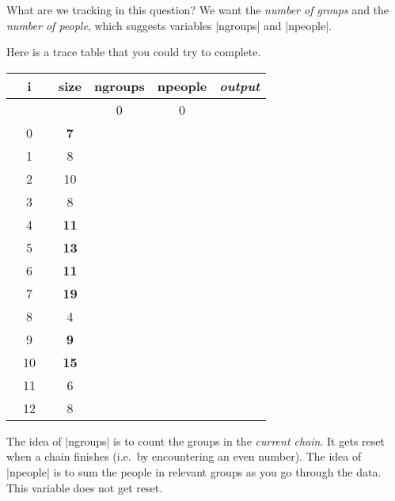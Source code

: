 What are we tracking in this question? We want the \emph{number of groups} and the
\emph{number of people}, which suggests variables \pycode|ngroups| and \pycode|npeople|.

Here is a trace table that you could try to complete.

\begin{inlinetable}
  \begin{tabular}{S[table-format=2.0]S[table-format=2.0]ccc}
    \toprule
    {~~i~~} & {size}       & {ngroups} & {npeople} & {\emph{output}} \\
    \midrule
            &              & 0         & 0         &                 \\
    0       & \bfseries 7  &           &           &                 \\
    1       & 8            &           &           &                 \\
    2       & 10           &           &           &                 \\
    3       & 8            &           &           &                 \\
    4       & \bfseries 11 &           &           &                 \\
    5       & \bfseries 13 &           &           &                 \\
    6       & \bfseries 11 &           &           &                 \\
    7       & \bfseries 19 &           &           &                 \\
    8       & 4            &           &           &                 \\
    9       & \bfseries 9  &           &           &                 \\
    10      & \bfseries 15 &           &           &                 \\
    11      & 6            &           &           &                 \\
    12      & 8            &           &           &                 \\
    \bottomrule
  \end{tabular}
\end{inlinetable}

The idea of \pycode|ngroups| is to count the groups in the \emph{current chain}. It gets
reset when a chain finishes (i.e.~by encountering an even number). The idea of
\pycode|npeople| is to sum the people in relevant groups as you go through the data. This
variable does not get reset.

